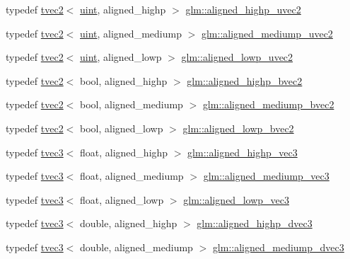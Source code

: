 \begin{DoxyCompactItemize}
typedef \hyperlink{structglm_1_1tvec2}{tvec2}$<$ \hyperlink{group__core__precision_ga4fd29415871152bfb5abd588334147c8}{uint}, aligned\+\_\+highp $>$ \hyperlink{group__gtc__type__aligned_gadbe09d1af82957ec00a3baaa89120f1e}{glm\+::aligned\+\_\+highp\+\_\+uvec2}
\item 
typedef \hyperlink{structglm_1_1tvec2}{tvec2}$<$ \hyperlink{group__core__precision_ga4fd29415871152bfb5abd588334147c8}{uint}, aligned\+\_\+mediump $>$ \hyperlink{group__gtc__type__aligned_ga4f1b08e51e44ae6de175343f10ec54a7}{glm\+::aligned\+\_\+mediump\+\_\+uvec2}
\item 
typedef \hyperlink{structglm_1_1tvec2}{tvec2}$<$ \hyperlink{group__core__precision_ga4fd29415871152bfb5abd588334147c8}{uint}, aligned\+\_\+lowp $>$ \hyperlink{group__gtc__type__aligned_gae35234d451a8160abf2915753e015269}{glm\+::aligned\+\_\+lowp\+\_\+uvec2}
\item 
typedef \hyperlink{structglm_1_1tvec2}{tvec2}$<$ bool, aligned\+\_\+highp $>$ \hyperlink{group__gtc__type__aligned_ga0864e6acd440d07a7eff815da8990467}{glm\+::aligned\+\_\+highp\+\_\+bvec2}
\item 
typedef \hyperlink{structglm_1_1tvec2}{tvec2}$<$ bool, aligned\+\_\+mediump $>$ \hyperlink{group__gtc__type__aligned_ga6a8eda49fb7f05dc574be67d8988822b}{glm\+::aligned\+\_\+mediump\+\_\+bvec2}
\item 
typedef \hyperlink{structglm_1_1tvec2}{tvec2}$<$ bool, aligned\+\_\+lowp $>$ \hyperlink{group__gtc__type__aligned_gab9dc3bd3ccc5a3a8c30a4bd4b6927782}{glm\+::aligned\+\_\+lowp\+\_\+bvec2}
\item 
typedef \hyperlink{structglm_1_1tvec3}{tvec3}$<$ float, aligned\+\_\+highp $>$ \hyperlink{group__gtc__type__aligned_ga69a63faccd6a139ff97748c81a603d50}{glm\+::aligned\+\_\+highp\+\_\+vec3}
\item 
typedef \hyperlink{structglm_1_1tvec3}{tvec3}$<$ float, aligned\+\_\+mediump $>$ \hyperlink{group__gtc__type__aligned_ga26e1bf19f9506f2b36949687d927fe63}{glm\+::aligned\+\_\+mediump\+\_\+vec3}
\item 
typedef \hyperlink{structglm_1_1tvec3}{tvec3}$<$ float, aligned\+\_\+lowp $>$ \hyperlink{group__gtc__type__aligned_ga19ab3efcfafe1def4240723f7056ca79}{glm\+::aligned\+\_\+lowp\+\_\+vec3}
\item 
typedef \hyperlink{structglm_1_1tvec3}{tvec3}$<$ double, aligned\+\_\+highp $>$ \hyperlink{group__gtc__type__aligned_ga8f0cf063fb87e4bd3a26ec242a71d75d}{glm\+::aligned\+\_\+highp\+\_\+dvec3}
\item 
typedef \hyperlink{structglm_1_1tvec3}{tvec3}$<$ double, aligned\+\_\+mediump $>$ \hyperlink{group__gtc__type__aligned_ga1ba09491d449d986ea0d63172e96a598}{glm\+::aligned\+\_\+mediump\+\_\+dvec3}

\end{DoxyCompactItemize}

